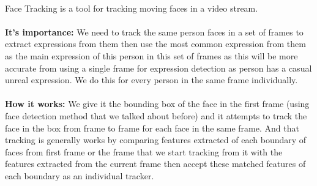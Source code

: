 \paragraph{}
Face Tracking is a tool for tracking moving faces in a video stream.
\paragraph{}
\textbf{It’s importance:}\newline
We need to track the same person faces in a set of frames to extract expressions from them then use the most common expression from them as the main expression of this person in this set of frames as this will be more accurate from using a single frame for expression detection as person has a casual unreal expression. We do this for every person in the same frame individually.
\paragraph{}
\textbf{How it works:}\newline
We give it the bounding box of the face in the first frame (using face detection method that we talked about before) and it attempts to track the face in the box from frame to frame for each face in the same frame.\newline
And that tracking is generally works by comparing features extracted of each boundary of faces from first frame or the frame that we start tracking from it with the features extracted from the current frame then accept these matched features of each boundary as an individual tracker.

